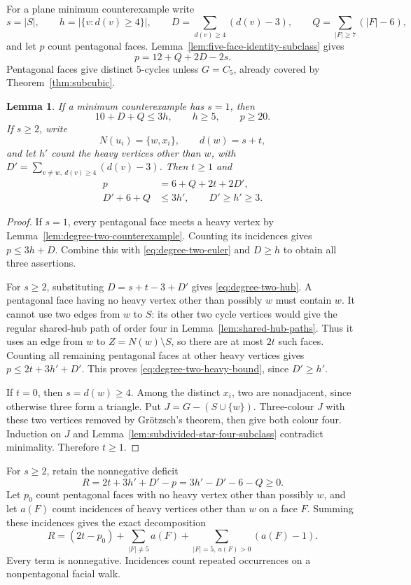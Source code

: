 \documentclass[11pt]{article}
\newtheorem{lemma}[theorem]{Lemma}
\theoremstyle{remark}
\numberwithin{equation}{section}
\numberwithin{table}{section}
\begin{document}
For a plane minimum counterexample write
\[
 s=|S|,\qquad h=|\{v:d(v)\ge4\}|,\qquad
 D=\sum_{d(v)\ge4}(d(v)-3),\qquad
 Q=\sum_{|F|\ge7}(|F|-6),
\]
and let $p$ count pentagonal faces. Lemma~\ref{lem:five-face-identity-subclass}
gives
\begin{equation}\label{eq:degree-two-euler}
 p=12+Q+2D-2s.
\end{equation}
Pentagonal faces give distinct $5$-cycles unless $G=C_5$, already covered
by Theorem~\ref{thm:subcubic}.

\begin{lemma}\label{lem:heavy-vertex-bounds}
If a minimum counterexample has $s=1$, then
\[
 10+D+Q\le3h,\qquad h\ge5,\qquad p\ge20.
\]
If $s\ge2$, write
\[
 N(u_i)=\{w,x_i\},\qquad d(w)=s+t,
\]
and let $h'$ count the heavy vertices other than $w$, with
$D'=\sum_{v\ne w,\ d(v)\ge4}(d(v)-3)$. Then $t\ge1$ and
\begin{align}
 p&=6+Q+2t+2D',\label{eq:degree-two-hub}\\
 D'+6+Q&\le3h',\qquad D'\ge h'\ge3.\label{eq:degree-two-heavy-bound}
\end{align}
\end{lemma}
\begin{proof}
If $s=1$, every pentagonal face meets a heavy vertex by
Lemma~\ref{lem:degree-two-counterexample}. Counting its incidences gives
$p\le3h+D$. Combine this with \eqref{eq:degree-two-euler} and $D\ge h$
to obtain all three assertions.

For $s\ge2$, substituting $D=s+t-3+D'$ gives
\eqref{eq:degree-two-hub}. A pentagonal face having no heavy vertex other
than possibly $w$ must contain $w$. It cannot use two edges from $w$ to
$S$: its other two cycle vertices would give the regular shared-hub path
of order four in Lemma~\ref{lem:shared-hub-paths}. Thus it uses an edge
from $w$ to $Z=N(w)\setminus S$, so there are at most $2t$ such faces.
Counting all remaining pentagonal faces at other heavy vertices gives
$p\le2t+3h'+D'$. This proves \eqref{eq:degree-two-heavy-bound}, since
$D'\ge h'$.

If $t=0$, then $s=d(w)\ge4$. Among the distinct $x_i$, two are nonadjacent,
since otherwise three form a triangle. Put $J=G-(S\cup\{w\})$.
Three-colour $J$ with these two vertices removed by Gr\"otzsch's theorem,
then give both colour four. Induction on $J$ and
Lemma~\ref{lem:subdivided-star-four-subclass} contradict minimality.
Therefore $t\ge1$.
\end{proof}

For $s\ge2$, retain the nonnegative deficit
\begin{equation}\label{eq:degree-two-deficit}
 R=2t+3h'+D'-p=3h'-D'-6-Q\ge0.
\end{equation}
Let $p_0$ count pentagonal faces with no heavy vertex other than possibly
$w$, and let $a(F)$ count incidences of heavy vertices other than $w$ on a
face $F$. Summing these incidences gives the exact decomposition
\begin{equation}\label{eq:degree-two-deficit-parts}
 R=(2t-p_0)+\sum_{|F|\ne5}a(F)
       +\sum_{|F|=5,\ a(F)>0}(a(F)-1).
\end{equation}
Every term is nonnegative. Incidences count repeated occurrences on a
nonpentagonal facial walk.
\end{document}
